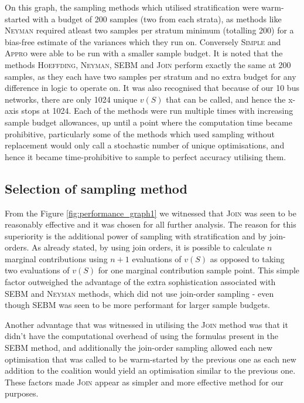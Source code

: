 On this graph, the sampling methods which utilised stratification were warm-started with a budget of 200 samples (two from each strata), as methods like \textsc{Neyman} required atleast two samples per stratum minimum (totalling 200) for a bias-free estimate of the variances which they run on.
Conversely \textsc{Simple} and \textsc{Appro} were able to be run with a smaller sample budget.
It is noted that the methods \textsc{Hoeffding}, \textsc{Neyman}, \textsc{SEBM} and \textsc{Join} perform exactly the same at 200 samples, as they each have two samples per stratum and no extra budget for any difference in logic to operate on.
It was also recognised that because of our 10 bus networks, there are only 1024 unique \DIFdelbegin {}\DIFdelend \DIFaddbegin {}\DIFaddend $v(S)$ that can be called, and hence the x-axis stops at 1024.
Each of the methods were run multiple times with increasing sample budget allowances, up until a point where the computation time became prohibitive, particularly some of the methods which used sampling without replacement would only call a stochastic number of unique optimisations, and hence it became time-prohibitive to sample to perfect accuracy utilising them.

\subsection{Selection of sampling method}\label{subsection:selection_of_sampling_method}

From the Figure \ref{fig:performance_graph1} we witnessed that \textsc{Join} was seen to be reasonably effective and it was chosen for all further analysis.
The reason for this superiority is the additional power of sampling with stratification and by join-orders.
As already stated, by using join orders, it is possible to calculate $n$ marginal contributions using $n+1$ evaluations of $v(S)$ as opposed to taking two evaluations of $v(S)$ for one marginal contribution sample point.
This simple factor outweighed the advantage of the extra sophistication associated with \textsc{SEBM} and \textsc{Neyman} methods, which did not use join-order sampling - even though SEBM was seen to be more performant for larger sample budgets.
\DIFaddbegin {}\textsc{} 

\DIFaddend Another advantage that was witnessed in utilising the \textsc{Join} method was that it didn't have the computational overhead of using the formulas present in the \textsc{SEBM} method, and additionally the join-order sampling allowed each new optimisation that was called to be warm-started by the previous one as each new addition to the coalition would yield an optimisation similar to the previous one.
These factors made \textsc{Join} appear as \DIFaddbegin {}\DIFaddend simpler and more effective method for our purposes.

